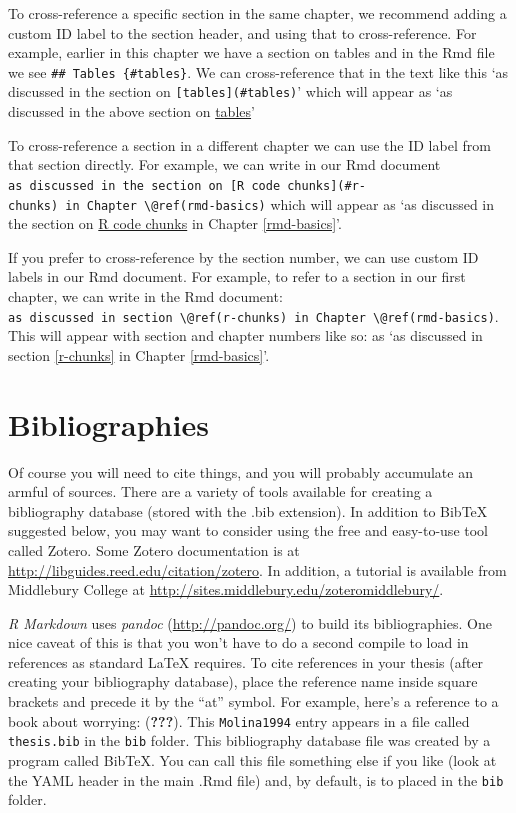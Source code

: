 \documentclass [11pt, proquest] {uwthesis}[2015/03/03]
\begin{document}
To cross-reference a specific section in the same chapter, we recommend
adding a custom ID label to the section header, and using that to
cross-reference. For example, earlier in this chapter we have a section
on tables and in the Rmd file we see
\texttt{\#\#\ Tables\ \{\#tables\}}. We can cross-reference that in the
text like this `as discussed in the section on
\texttt{{[}tables{]}(\#tables)}' which will appear as `as discussed in
the above section on \protect\hyperlink{tables}{tables}'

To cross-reference a section in a different chapter we can use the ID
label from that section directly. For example, we can write in our Rmd
document
\texttt{as\ discussed\ in\ the\ section\ on\ {[}R\ code\ chunks{]}(\#r-chunks)\ in\ Chapter\ \textbackslash{}@ref(rmd-basics)}
which will appear as `as discussed in the section on
\protect\hyperlink{r-chunks}{R code chunks} in Chapter
\ref{rmd-basics}'.

If you prefer to cross-reference by the section number, we can use
custom ID labels in our Rmd document. For example, to refer to a section
in our first chapter, we can write in the Rmd document:
\texttt{as\ discussed\ in\ section\ \textbackslash{}@ref(r-chunks)\ in\ Chapter\ \textbackslash{}@ref(rmd-basics)}.
This will appear with section and chapter numbers like so: as `as
discussed in section \ref{r-chunks} in Chapter \ref{rmd-basics}'.

\section{Bibliographies}\label{bibliographies}

Of course you will need to cite things, and you will probably accumulate
an armful of sources. There are a variety of tools available for
creating a bibliography database (stored with the .bib extension). In
addition to BibTeX suggested below, you may want to consider using the
free and easy-to-use tool called Zotero. Some Zotero documentation is at
\url{http://libguides.reed.edu/citation/zotero}. In addition, a tutorial
is available from Middlebury College at
\url{http://sites.middlebury.edu/zoteromiddlebury/}.

\emph{R Markdown} uses \emph{pandoc} (\url{http://pandoc.org/}) to build
its bibliographies. One nice caveat of this is that you won't have to do
a second compile to load in references as standard LaTeX requires. To
cite references in your thesis (after creating your bibliography
database), place the reference name inside square brackets and precede
it by the ``at'' symbol. For example, here's a reference to a book about
worrying: ({\textbf{???}}). This \texttt{Molina1994} entry appears in a
file called \texttt{thesis.bib} in the \texttt{bib} folder. This
bibliography database file was created by a program called BibTeX. You
can call this file something else if you like (look at the YAML header
in the main .Rmd file) and, by default, is to placed in the \texttt{bib}
folder.
\end{document}
